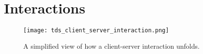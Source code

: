 \documentclass[../design_doc.tex]{subfiles}
\begin{document}
\section{Interactions}\label{sec:interationdiagrams}
    \begin{figure}[h]
        \centering
        \texttt{[image: tds\_client\_server\_interaction.png]}
        \caption{A simplified view of how a client-server interaction unfolds.}\label{fig:clientserverinteraction}
    \end{figure}
\end{document}
